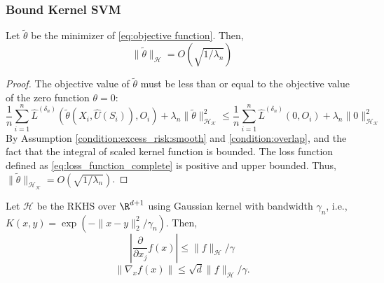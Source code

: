 \subsubsection{Bound Kernel SVM}


\begin{lemma}\label{lemma:bound_svm} Let $\tilde\theta$ be the minimizer of \eqref{eq:objective function}. Then, 
$$\|\tilde\theta\|_{\mathcal{H}}=O(\sqrt{1/\lambda_n}) $$
\end{lemma}

\begin{proof}
The objective value of $\tilde\theta$ must be less than or equal to the objective value of the zero function $\theta = 0$:
$$\frac{1}{n}\sum_{i=1}^n \widehat L^{({\delta_n})}(\tilde\theta(X_i,\widehat U(S_i)),O_i)+\lambda_n\|\tilde\theta\|^2_{\mathcal{H}_\mathcal{K}}\leq \frac{1}{n}\sum_{i=1}^n \widehat L^{({\delta_n})}(0,O_i)+\lambda_n\|0\|^2_{\mathcal{H}_\mathcal{K}}$$
By Assumption \ref{condition:excess_risk:smooth} and \ref{condition:overlap}, and the fact that the integral of scaled kernel function is bounded. The loss function defined as \eqref{eq:loss_function_complete} is positive and upper bounded. Thus, $\|\tilde\theta\|_{\mathcal{H}_\mathcal{K}}= O(\sqrt{1/\lambda_n})$.
\end{proof}

\begin{lemma}\label{lemma:derivative_svm}
Let $\mathcal{H}$ be the RKHS over $\R^{d+1}$ using Gaussian kernel with bandwidth $\gamma_n$, i.e., $K(x,y) = \exp(-\|x-y\|_2^2/\gamma_n)$. Then,
$$\left| \frac{\partial}{\partial x_j} f(x) \right| \leq \|f\|_{\mathcal{H}}/\gamma$$
$$\|\nabla_x f(x)\| \leq  \sqrt{d}\|f\|_{\mathcal{H}}/\gamma.$$
    
\end{lemma}


